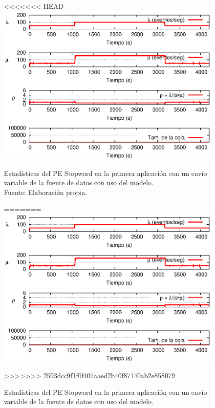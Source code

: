 \begin{figure}[!ht]
<<<<<<< HEAD
    \centering
    \captionsetup{justification=centering}
    \includegraphics[scale=1]{images/exp/app1/normal/cm/statusStopwordPE.eps}
    \caption[Estadísticas del PE Stopword en la primera aplicación con un envío variable de la fuente de datos con uso del modelo.]{Estadísticas del PE Stopword en la primera aplicación con un envío variable de la fuente de datos con uso del modelo.\\Fuente: Elaboración propia.}
=======
\centering
    \includegraphics[scale=1.1]{images/exp/app1/normal/cm/statusStopwordPE.eps}
    \caption{Estad\'isticas del PE Stopword en la primera aplicaci\'on con un env\'io variable de la fuente de datos con uso del modelo.}
>>>>>>> 2593dcc9f1f0f407aaed2b40f87140ab2e858079
    \label{fig:app1-normal-statusStopwordPE-cm}
\end{figure}

